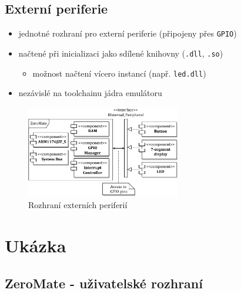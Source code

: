 \documentclass[compress]{beamer}
\begin{document}
\subsection{Externí periferie}

\begin{frame}
	\vspace{0.4cm}
	\begin{itemize}
		\item jednotné rozhraní pro externí periferie (připojeny přes \texttt{GPIO})
		\item načtené při inicializaci jako sdílené knihovny (\texttt{.dll}, \texttt{.so})
		\begin{itemize}
			\item možnost načtení vícero instancí (např. \texttt{led.dll})
		\end{itemize}
		\item nezávislé na toolchainu jádra emulátoru
	\end{itemize}
	\begin{figure}
		\centering
		\includegraphics[width=0.6\textwidth]{img/peripheral_interface.pdf}
		\caption{Rozhraní externích periferií}
	\end{figure}
\end{frame}

\section{Ukázka}

\subsection{ZeroMate - uživatelské rozhraní}
\end{document}
